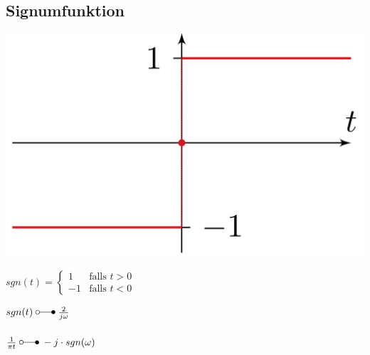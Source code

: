 	\subsection{Signumfunktion}
		\begin{minipage}{0.2\textwidth}
			\includegraphics[width=\textwidth]{./bilder/funktionen/signF.png}
		\end{minipage}
		\qquad
		\begin{minipage}{0.45\textwidth}
			$sgn(t) = \begin{cases} 1 & \text{falls }t > 0 \\ -1 & \text{falls }t < 0 \end{cases}$
		\end{minipage}
		\qquad
		\begin{minipage}{0.25\textwidth}						
			$sgn(t) \; \laplace \; \frac{2}{j\omega}$\\
			\\
			$\frac{1}{\pi t} \; \laplace \; -j \cdot sgn(\omega)$\\
		\end{minipage}		

		
